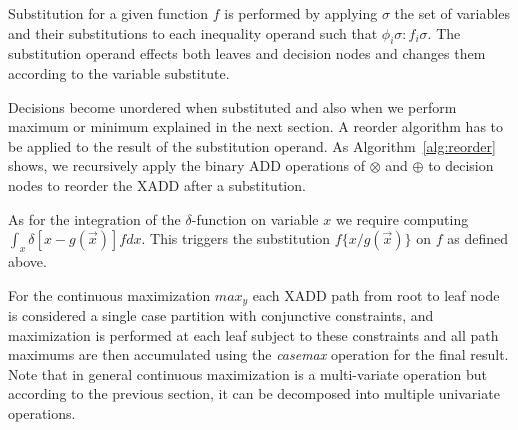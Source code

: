 \documentclass[twoside,11pt]{article}
\begin{document}
Substitution for a given function $f$ is performed by applying $\sigma$ the set of variables and their substitutions to each inequality operand such that $\phi_i\sigma: f_i\sigma$. The substitution operand effects both leaves and decision nodes and changes them according to the variable substitute. 

Decisions become unordered when substituted and also when we perform maximum or minimum explained in the next section. A reorder algorithm has to be applied to the result of the substitution operand. As Algorithm~\ref{alg:reorder} shows, we recursively apply the binary ADD operations of $\otimes$ and $\oplus$ to decision nodes to reorder the XADD after a substitution. 

As for the integration of the $\delta$-function on variable $x$ we require computing $\int_{x} \delta [ x - g(\vec{x})]fdx$. This triggers the substitution $f \lbrace x/ g(\vec{x})\rbrace$ on $f$ as defined above.  

For the continuous maximization $max_y$ each XADD path from root to leaf node is considered a single case partition with conjunctive constraints, and maximization is performed at each leaf subject to these constraints and all path maximums are then accumulated using the \textit{casemax} operation for the final result. Note that in general continuous maximization is a multi-variate operation but according to the previous section, it can be decomposed into multiple univariate operations. 
\end{document}

